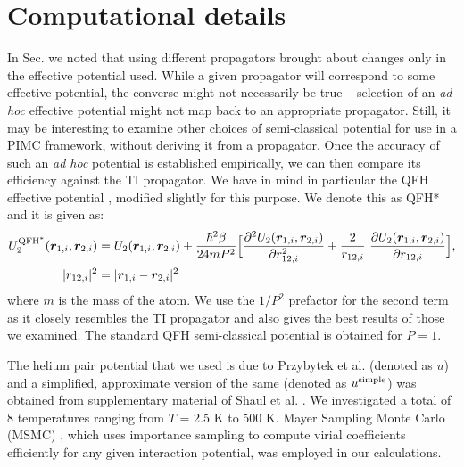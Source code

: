 \section{Computational details}
    In Sec. we noted that using different propagators brought about changes only in the effective potential used. While a given propagator will correspond to some effective potential, the converse might not necessarily be true -- selection of an \emph{ad hoc} effective potential might not map back to an appropriate propagator. Still, it may be interesting to examine other choices of semi-classical potential for use in a PIMC framework, without deriving it from a propagator. Once the accuracy of such an \emph{ad hoc} potential is established empirically, we can then compare its efficiency against the TI propagator. We have in mind in particular the QFH effective potential \cite{Feynman, Schenter2002},
    modified slightly for this purpose. We denote this as QFH* and it is given as:
    \begin{equation}\label{eq:QFHCh3}
        \begin{aligned}
            U_2^{\rm QFH^*} (\bm{r}_{1,i}, \bm{r}_{2,i}) &= U_2 (\bm{r}_{1,i}, \bm{r}_{2,i}) + \displaystyle\frac{\hbar^2 \beta}{24 m P^2} \Big[ \frac{\partial^2 U_2 (\bm{r}_{1,i}, \bm{r}_{2,i})}{\partial r_{12,i}^2} + \frac{2}{r_{12,i}}~\frac{\partial U_2 (\bm{r}_{1,i}, \bm{r}_{2,i})}{\partial r_{12,i}}  \Big],\\
            |r_{12,i}|^2 &= |\bm{r}_{1,i} - \bm{r}_{2,i}|^2
        \end{aligned}
    \end{equation}
    where $m$ is the mass of the atom. We use the $1/P^2$ prefactor for the second term as it closely resembles the TI propagator and also gives the best results of those we examined. The standard QFH semi-classical potential is obtained for $P = 1$.

    The \abinitio{} helium pair potential that we used is due to Przybytek et al. \cite{Przybytek2010} (denoted as $u$) and a simplified, approximate version of the same (denoted as $u^{\rm simple}$) was obtained from supplementary material of Shaul et al. \cite{Shaul2012}. We investigated a total of 8 temperatures ranging from $T$ = 2.5 K to 500 K. Mayer Sampling Monte Carlo (MSMC) \cite{Singh2004,Schultz2009}, which uses importance sampling to compute virial coefficients efficiently for any given interaction potential, was employed in our calculations.

